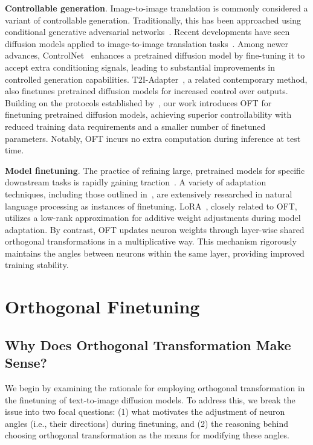 \textbf{Controllable generation}. Image-to-image translation is commonly considered a variant of controllable generation. Traditionally, this has been approached using conditional generative adversarial networks~\cite{isola2017image,zhu2017toward,wang2018high,park2019semantic,choi2018stargan}. Recent developments have seen diffusion models applied to image-to-image translation tasks~\cite{saharia2022palette,voynov2022sketch,wang2022pretraining}. Among newer advances, ControlNet~\cite{zhang2023adding} enhances a pretrained diffusion model by fine-tuning it to accept extra conditioning signals, leading to substantial improvements in controlled generation capabilities. T2I-Adapter~\cite{mou2023t2i}, a related contemporary method, also finetunes pretrained diffusion models for increased control over outputs. Building on the protocols established by~\cite{zhang2023adding,mou2023t2i}, our work introduces OFT for finetuning pretrained diffusion models, achieving superior controllability with reduced training data requirements and a smaller number of finetuned parameters. Notably, OFT incurs no extra computation during inference at test time.

\textbf{Model finetuning}. The practice of refining large, pretrained models for specific downstream tasks is rapidly gaining traction~\cite{devlin2018bert,brown2020language,he2022masked}. A variety of adaptation techniques, including those outlined in~\cite{hulora2022,houlsby2019parameter,pfeiffer2020adapterfusion}, are extensively researched in natural language processing as instances of finetuning. LoRA~\cite{hulora2022}, closely related to OFT, utilizes a low-rank approximation for additive weight adjustments during model adaptation. By contrast, OFT updates neuron weights through layer-wise shared orthogonal transformations in a multiplicative way. This mechanism rigorously maintains the angles between neurons within the same layer, providing improved training stability.

\section{Orthogonal Finetuning}

\subsection{Why Does Orthogonal Transformation Make Sense?}

We begin by examining the rationale for employing orthogonal transformation in the finetuning of text-to-image diffusion models. To address this, we break the issue into two focal questions: (1) what motivates the adjustment of neuron angles (i.e., their directions) during finetuning, and (2) the reasoning behind choosing orthogonal transformation as the means for modifying these angles.

